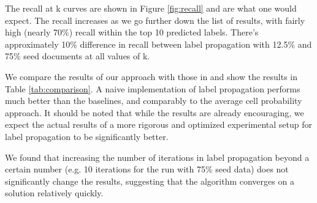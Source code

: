 The recall at k curves are shown in Figure \ref{fig:recall} and are what one
would expect. The recall increases as we go further down the list of results,
with fairly high (nearly 70\%) recall within the top 10 predicted labels.
There's approximately 10\% difference in recall between label propagation with
12.5\% and 75\% seed documents at all values of k.

We compare the results of our approach with those in 
and show the results in Table \ref{tab:comparison}. A naive implementation of
label propagation performs much better than the baselines, and comparably to
the average cell probability approach. It should be noted that while the
results are already encouraging, we expect the actual results of a more
rigorous and optimized experimental setup for label propagation to be
significantly better.

We found that increasing the number of iterations in label propagation beyond
a certain number (e.g. 10 iterations for the run with 75\% seed data) does not
significantly change the results, suggesting that the algorithm converges on a
solution relatively quickly.

